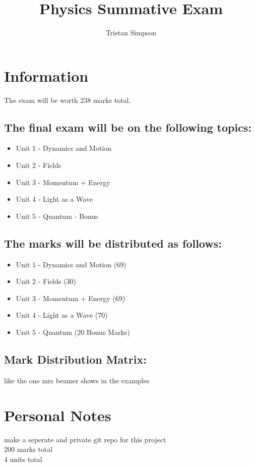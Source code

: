 \documentclass{article}
\title{Physics Summative Exam}
\author{Tristan Simpson}
\begin{document}
\maketitle
\tableofcontents

\section{Information}
The exam will be worth 238 marks total.
\subsection*{The final exam will be on the following topics:}
\begin{itemize}
    \item Unit 1 - Dynamics and Motion
    \item Unit 2 - Fields
    \item Unit 3 - Momentum + Energy
    \item Unit 4 - Light as a Wave
    \item Unit 5 - Quantum - Bonus
\end{itemize}
\subsection*{The marks will be distributed as follows:}
\begin{itemize}
    \item Unit 1 - Dynamics and Motion (69)
    \item Unit 2 - Fields (30)
    \item Unit 3 - Momentum + Energy (69)
    \item Unit 4 - Light as a Wave (70)
    \item Unit 5 - Quantum (20 Bonus Marks)
\end{itemize}
\subsection*{Mark Distribution Matrix:}
like the one mrs beamer shows in the examples



\section{Personal Notes}
make a seperate and private git repo for this project \\
200 marks total \\
4 units total
\end{document}
